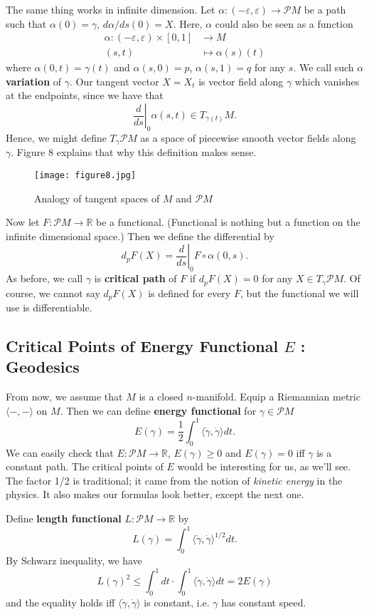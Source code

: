 \documentclass{article}
\newcommand{\R}{\mathbb{R}}
\newcommand{\ep}{\varepsilon}
\newcommand{\il}{\langle}
\newcommand{\ir}{\rangle}
\newcommand{\PM}{\mathcal{P}M}
\newcommand{\g}{\gamma}
\begin{document}
The same thing works in infinite dimension.
Let $\alpha:(-\ep,\ep)\to\PM$ be a path such that $\alpha(0)=\g$, $d\alpha/ds(0)=X$.
Here, $\alpha$ could also be seen as a function
	$$\begin{aligned}
	\alpha:(-\ep,\ep)\times[0,1]&\to M\\
			(s,t)&\mapsto \alpha(s)(t)
			\end{aligned}$$
where $\alpha(0,t)=\g(t)$ and $\alpha(s,0)=p$, $\alpha(s,1)=q$ for any $s$.
We call such $\alpha$ \textbf{variation} of $\g$.
Our tangent vector $X=X_t$ is vector field along $\g$ which vanishes at the endpoints, since we have that
	$$\left.\frac{d}{ds}\right|_{0}\alpha(s,t)\in T_{\g(t)}M.$$
Hence, we might define $T_\g\PM$ as a space of piecewise smooth vector fields along $\g$.
Figure 8 explains that why this definition makes sense.

\begin{figure}[h]
		\centering
		\texttt{[image: figure8.jpg]}
		\caption{Analogy of tangent spaces of $M$ and $\PM$}
\end{figure}

Now let $F:\PM\to\R$ be a functional.
(Functional is nothing but a function on the infinite dimensional space.)
Then we define the differential by
	$$d_pF(X)=\left.\frac{d}{ds}\right|_{0}F\circ\alpha(0,s).$$
As before, we call $\g$ is \textbf{critical path} of $F$ if $d_pF(X)=0$ for any $X\in T_\g\PM$.
Of course, we cannot say $d_pF(X)$ is defined for every $F$, but the functional we will use is differentiable.

\subsection{Critical Points of Energy Functional $E$ : Geodesics}

From now, we assume that $M$ is a closed $n$-manifold.
Equip a Riemannian metric $\il-,-\ir$ on $M$.
Then we can define \textbf{energy functional} for $\g\in\PM$
	$$E(\g)=\frac{1}{2}\int_0^1\il\dot{\g},\dot{\g}\ir dt.$$
We can easily check that $E:\PM\to\R$, $E(\g)\geq0$ and $E(\g)=0$ iff $\g$ is a constant path.
The critical points of $E$ would be interesting for us, as we'll see.
The factor 1/2 is traditional; it came from the notion of \emph{kinetic energy} in the physics.
It also makes our formulas look better, except the next one.

Define \textbf{length functional} $L:\PM\to\R$ by
	$$L(\g)=\int_0^1\il\dot{\g},\dot{\g}\ir^{1/2}dt.$$
By Schwarz inequality, we have
	$$L(\g)^2\leq \int_0^1dt\cdot\int_0^1\il\dot{\g},\dot{\g}\ir dt=2E(\g)$$
and the equality holds iff $\il\dot{\g},\dot{\g}\ir$ is constant, i.e. $\g$ has constant speed.
\end{document}
